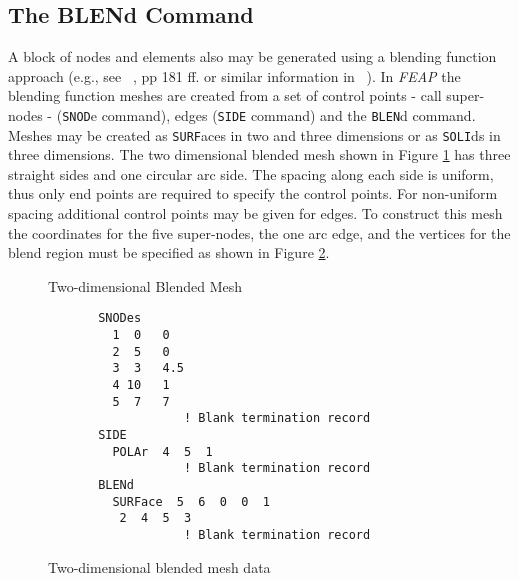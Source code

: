 \subsection{The BLENd Command}
\label{blend}

A block of nodes and elements also may be generated using a
blending function approach
(e.g., see ~\cite{zt1}, pp 181 ff. or similar information in ~\cite{zt1n}).
In {\sl FEAP} the blending function meshes are created from a set of control
points - call super-nodes - ({\tt SNOD}e command),
edges ({\tt SIDE} command) and
the {\tt BLEN}d command.  Meshes may be created as {\tt SURF}aces in
two and three dimensions or as {\tt SOLI}ds in three dimensions.  The
two dimensional blended mesh shown in Figure \ref{figb1} has three straight
sides and one circular arc side.  The spacing along each side is uniform,
thus only end points are required to specify the control points.
For non-uniform spacing additional control points may be given
for edges.  To construct this mesh the coordinates for the five
super-nodes, the one arc edge, and the vertices for the blend
region must be specified as shown in Figure \ref{figb2}.

\begin{figure}[ht!]
\epsfxsize=3.6in
\centerline {\hfil {} \hfil}
\caption{Two-dimensional Blended Mesh}
\label{figb1}
\end{figure}

\begin{figure}[ht!]
\begin{verbatim}
       SNODes
         1  0   0
         2  5   0
         3  3   4.5
         4 10   1
         5  7   7
                   ! Blank termination record
       SIDE
         POLAr  4  5  1
                   ! Blank termination record
       BLENd
         SURFace  5  6  0  0  1
          2  4  5  3
                   ! Blank termination record
\end{verbatim}
\caption{Two-dimensional blended mesh data}
\label{figb2}
\end{figure}

